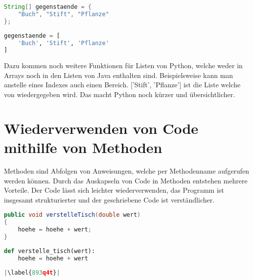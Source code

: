\begin{minipage}{.5\linewidth}
\begin{lstlisting}[language=java,caption={Einfache Deklarierung Java},captionpos=b,label={lst:java:ezarray},frame=none]
String[] gegenstaende = {
    "Buch", "Stift", "Pflanze"
};
\end{lstlisting}
\end{minipage}
\begin{minipage}{.5\linewidth}
\begin{lstlisting}[language=python,caption={Einfach Deklarierung Python},captionpos=b,label={lst:python:ezarray},frame=l]
gegenstaende = [
    'Buch', 'Stift', 'Pflanze'
]
\end{lstlisting}
\end{minipage}

Dazu kommen noch weitere Funktionen für Listen von Python, welche weder in Arrays noch in den Listen von Java enthalten sind. Beispielsweise kann man anstelle eines Indexes auch einen Bereich. ['Stift', 'Pflanze'] ist die Liste welche von  wiedergegeben wird. Das macht Python noch kürzer und übersichtlicher.\par

\section{Wiederverwenden von Code mithilfe von Methoden}
Methoden sind Abfolgen von Anweisungen, welche per Methodenname aufgerufen werden können. Durch das Auskapseln von Code in Methoden entstehen mehrere Vorteile. Der Code lässt sich leichter wiederverwenden, das Programm ist insgesamt strukturierter und der geschriebene Code ist verständlicher. \cite{Python3:Buch}\cite{Louis:2010}

\begin{minipage}{.5\linewidth}
\begin{lstlisting}[language=java,caption={Methoden in Java},captionpos=b,label={lst:java:methode},frame=none]
public void verstelleTisch(double wert)
{
    hoehe = hoehe + wert;
}
\end{lstlisting}
\end{minipage}
\begin{minipage}{.5\linewidth}
\begin{lstlisting}[language=python,caption={Methode in Python},captionpos=b,label={lst:python:methode},frame=l,escapechar=|]
def verstelle_tisch(wert):
    hoehe = hoehe + wert
    
|\label{893q4t}|
\end{lstlisting}
\end{minipage}

